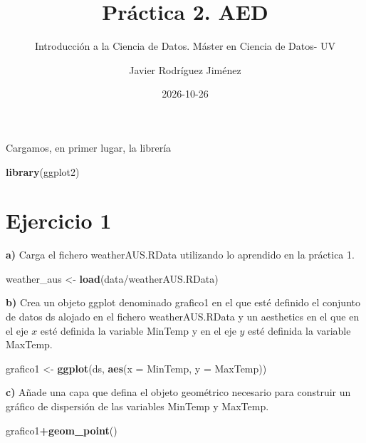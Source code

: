 \documentclass[
  spanish,
]{article}
\title{Práctica 2. AED}
\subtitle{Introducción a la Ciencia de Datos. Máster en Ciencia de Datos- UV}
\author{Javier Rodríguez Jiménez}
\date{2026-10-26}
\newenvironment{Shaded}{\begin{snugshade}}{\end{snugshade}}
\newcommand{\AttributeTok}[1]{\textcolor[rgb]{0.13,0.29,0.53}{#1}}
\newcommand{\FunctionTok}[1]{\textcolor[rgb]{0.13,0.29,0.53}{\textbf{#1}}}
\newcommand{\NormalTok}[1]{#1}
\newcommand{\OtherTok}[1]{\textcolor[rgb]{0.56,0.35,0.01}{#1}}
\newcommand{\SpecialCharTok}[1]{\textcolor[rgb]{0.81,0.36,0.00}{\textbf{#1}}}
\newcommand{\StringTok}[1]{\textcolor[rgb]{0.31,0.60,0.02}{#1}}
\begin{document}
\maketitle

{
\setcounter{tocdepth}{3}
\tableofcontents
}
Cargamos, en primer lugar, la librería

\begin{Shaded}
\begin{Highlighting}[]
\FunctionTok{library}\NormalTok{(ggplot2)}
\end{Highlighting}
\end{Shaded}

\section{Ejercicio 1}\label{ejercicio-1}

\textbf{a)} Carga el fichero weatherAUS.RData utilizando lo aprendido en la práctica 1.

\begin{Shaded}
\begin{Highlighting}[]
\NormalTok{weather\_aus }\OtherTok{\textless{}{-}} \FunctionTok{load}\NormalTok{(}\StringTok{\textquotesingle{}data/weatherAUS.RData\textquotesingle{}}\NormalTok{)}
\end{Highlighting}
\end{Shaded}

\textbf{b)} Crea un objeto ggplot denominado grafico1 en el que esté definido el conjunto de datos ds alojado en el fichero weatherAUS.RData y un aesthetics en el que en el eje \(x\) esté definida la variable MinTemp y en el eje \(y\) esté definida la variable MaxTemp.

\begin{Shaded}
\begin{Highlighting}[]
\NormalTok{grafico1 }\OtherTok{\textless{}{-}} \FunctionTok{ggplot}\NormalTok{(ds, }\FunctionTok{aes}\NormalTok{(}\AttributeTok{x =}\NormalTok{ MinTemp, }\AttributeTok{y =}\NormalTok{ MaxTemp))}
\end{Highlighting}
\end{Shaded}

\textbf{c)} Añade una capa que defina el objeto geométrico necesario para construir un gráfico de dispersión de las variables MinTemp y MaxTemp.

\begin{Shaded}
\begin{Highlighting}[]
\NormalTok{grafico1}\SpecialCharTok{+}\FunctionTok{geom\_point}\NormalTok{()}
\end{Highlighting}
\end{Shaded}
\end{document}
